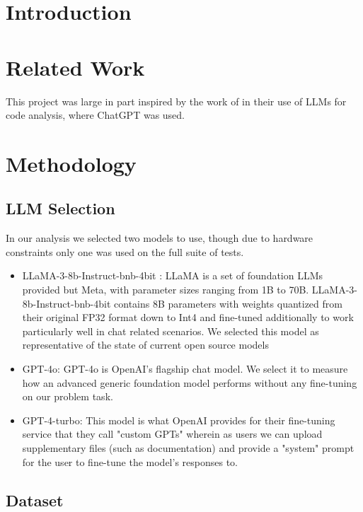 \section{Introduction}




\section{Related Work}

This project was large in part inspired by the work of \cite{fang2024large} in
their use of LLMs for code analysis, where ChatGPT was used.

\section{Methodology}

\subsection{LLM Selection}

In our analysis we selected two models to use, though due to hardware
constraints only one was used on the full suite of tests. 
\begin{itemize}
  \item LLaMA-3-8b-Instruct-bnb-4bit \cite{llama3modelcard}: LLaMA is a set of
  foundation LLMs provided but Meta, with parameter sizes ranging from 1B to
  70B. LLaMA-3-8b-Instruct-bnb-4bit contains 8B parameters with weights
  quantized from their original FP32 format down to Int4 and fine-tuned
  additionally to work particularly well in chat related scenarios. We selected
  this model as representative of the state of current open source models

  \item GPT-4o: GPT-4o is OpenAI's flagship chat model. We select it to measure
  how an advanced generic foundation model performs without any fine-tuning on
  our problem task.

  \item GPT-4-turbo: This model is what OpenAI provides for their fine-tuning
  service that they call "custom GPTs" wherein as users we can upload
  supplementary files (such as documentation) and provide a "system" prompt for
  the user to fine-tune the model's responses to.
\end{itemize}

\subsection{Dataset}

